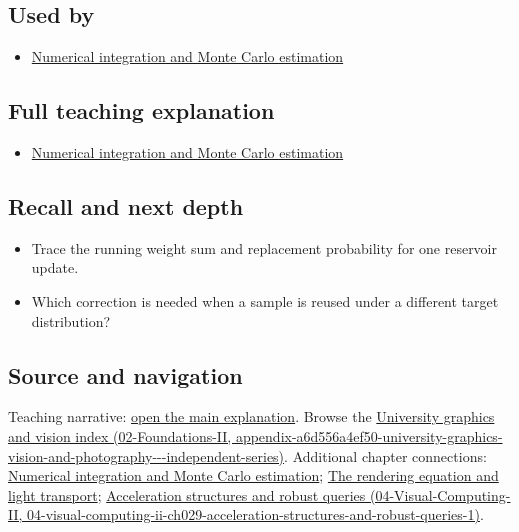 \subsection{Used by}\label{appendix-68be451b78b1-used-by}

\begin{itemize}
\tightlist
\item
  \hyperref[03-visual-computing-i-ch012-numerical-integration-and-monte-carlo-estimation]{Numerical integration and Monte Carlo estimation}
\end{itemize}

\subsection{Full teaching explanation}\label{appendix-68be451b78b1-full-teaching-explanation}

\begin{itemize}
\tightlist
\item
  \hyperref[03-visual-computing-i-ch012-numerical-integration-and-monte-carlo-estimation]{Numerical integration and Monte Carlo estimation}
\end{itemize}

\subsection{Recall and next depth}\label{appendix-68be451b78b1-recall-and-next-depth}

\begin{itemize}
\tightlist
\item
  Trace the running weight sum and replacement probability for one reservoir update.
\item
  Which correction is needed when a sample is reused under a different target distribution?
\end{itemize}

\subsection{Source and navigation}\label{appendix-68be451b78b1-source-and-navigation}

Teaching narrative: \hyperref[03-visual-computing-i-ch012-numerical-integration-and-monte-carlo-estimation]{open the main explanation}. Browse the \href{../02-Foundations-II/main.pdf\#nameddest=appendix-a6d556a4ef50-university-graphics-vision-and-photography---independent-series}{University graphics and vision index (02-Foundations-II, appendix-a6d556a4ef50-university-graphics-vision-and-photography-\/-\/-independent-series)}. Additional chapter connections: \hyperref[03-visual-computing-i-ch012-numerical-integration-and-monte-carlo-estimation]{Numerical integration and Monte Carlo estimation}; \hyperref[03-visual-computing-i-ch007-the-rendering-equation-and-light-transport]{The rendering equation and light transport}; \href{../04-Visual-Computing-II/main.pdf\#nameddest=04-visual-computing-ii-ch029-acceleration-structures-and-robust-queries-1}{Acceleration structures and robust queries (04-Visual-Computing-II, 04-visual-computing-ii-ch029-acceleration-structures-and-robust-queries-1)}.

